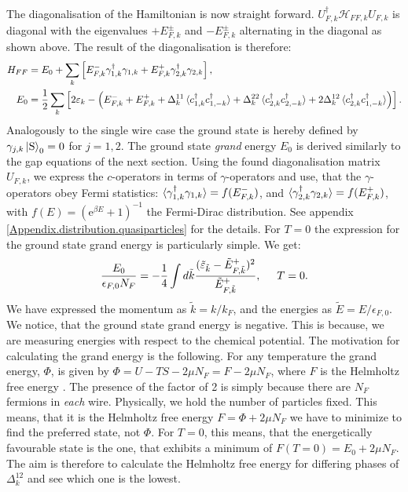 The diagonalisation of the Hamiltonian is now straight forward. $U^\dagger_{F,k}\mathcal{H}_{FF,k}U_{F,k}$ is diagonal with the eigenvalues $+E^{\pm}_{F,k}$ and $-E^{\pm}_{F,k}$ alternating in the diagonal as shown above. The result of the diagonalisation is therefore:
\begin{align}
H_{FF} &= E_0 + \sum_{k} \left[ E^{-}_{F,k}\gamma^\dagger_{1, k}\gamma_{1, k} + E^{+}_{F,k}\gamma^\dagger_{2, k}\gamma_{2, k} \right], \nonumber \\ 
E_0 &= \frac{1}{2}\sum_k \left[2\varepsilon_k - \left( E^{-}_{F,k} + E^{+}_{F,k} + \Delta^{11}_k\braket{c^\dagger_{1,k}c^\dagger_{1,-k}} + \Delta^{22}_k\braket{c^\dagger_{2,k}c^\dagger_{2,-k}} + 2\Delta^{12}_k\braket{c^\dagger_{2,k}c^\dagger_{1,-k}} \right) \right]. 
\label{eq.2wiresDiagonalisedHamiltonian}
\end{align}  
Analogously to the single wire case the ground state is hereby defined by $\gamma_{j,k}\ket{\text{S}}_0 = 0$ for $j = 1, 2$. The ground state \textit{grand} energy $E_0$ is derived similarly to the gap equations of the next section. Using the found diagonalisation matrix $U_{F,k}$, we express the $c$-operators in terms of $\gamma$-operators and use, that the $\gamma$-operators obey Fermi statistics: $\braket{\gamma^\dagger_{1,k}\gamma_{1,k}} = f(E^{-}_{F,k})$, and $\braket{\gamma^\dagger_{2,k}\gamma_{2,k}} = f(E^{+}_{F,k})$, with $f(E) = (\text{e}^{\beta E} + 1)^{-1}$ the Fermi-Dirac distribution. See appendix \ref{Appendix.distribution.quasiparticles} for the details. For $T = 0$ the expression for the ground state grand energy is particularly simple. We get:
\begin{equation}
\frac{E_0}{\epsilon_{F,0} N_F} = -\frac{1}{4} \int d\tilde{k} \frac{(\tilde{\varepsilon}_{\tilde{k}} - \tilde{E}^{+}_{F, \tilde{k}})^2}{\tilde{E}^{+}_{F, \tilde{k}}}, \hspace{0.5cm} T = 0. 
\label{eq.2wiresGrandGroundStateEnergy}
\end{equation}
We have expressed the momentum as $\tilde{k} = k/k_F$, and the energies as $\tilde{E} = E/\epsilon_{F,0}$. We notice, that the ground state grand energy is negative. This is because, we are measuring energies with respect to the chemical potential. The motivation for calculating the grand energy is the following. For any temperature the grand energy, $\Phi$, is given by $\Phi = U - TS - 2\mu N_F = F - 2\mu N_F$, where $F$ is the Helmholtz free energy \cite[pp. 161-162]{SchroederThermal}. The presence of the factor of 2 is simply because there are $N_F$ fermions in \textit{each} wire. Physically, we hold the number of particles fixed. This means, that it is the Helmholtz free energy $F = \Phi + 2\mu N_F$ we have to minimize to find the preferred state, not $\Phi$. For $T = 0$, this means, that the energetically favourable state is the one, that exhibits a minimum of $F(T = 0) = E_0 + 2\mu N_F$. The aim is therefore to calculate the Helmholtz free energy for differing phases of $\Delta^{12}_k$ and see which one is the lowest. 

